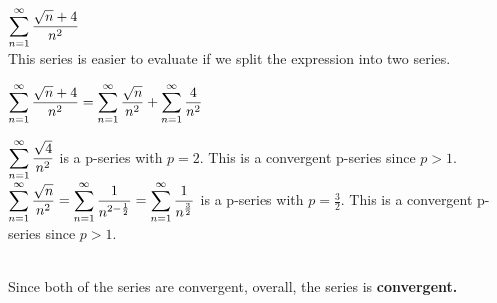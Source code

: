 \documentclass[12pt]{article}
\begin{document}
\begin{solution}
$\mathlarger{\sum_{n=1}^{\infty} \frac{\sqrt{n} + 4}{n^2}}$~\\

This series is easier to evaluate if we split the expression into two series.

$\mathlarger{\sum_{n=1}^{\infty} \frac{\sqrt{n} + 4}{n^2} = \sum_{n=1}^{\infty} \frac{\sqrt{n}}{n^2} + \sum_{n=1}^{\infty} \frac{4}{n^2}}$

\begin{addmargin}[1em]{2em}
$\mathlarger{\sum_{n=1}^{\infty} \frac{\sqrt{4}}{{n^2}}}$ is a p-series with $p = 2$. This is a convergent p-series since $p > 1$. ~\\

$\mathlarger{\sum_{n=1}^{\infty} \frac{\sqrt{n}}{n^2} = \sum_{n=1}^{\infty} \frac{1}{n^{2 - \frac{1}{2}}} = \sum_{n=1}^{\infty} \frac{1}{n^{\frac{3}{2}} }}$ is a p-series with $p = \frac{3}{2}$. This is a convergent p-series since $p > 1$.
\end{addmargin} ~\\
Since both of the series are convergent, overall, the series is \textbf{convergent.}
\end{solution}
\end{document}
